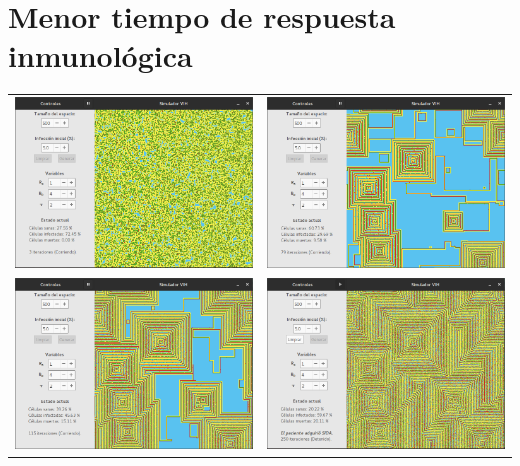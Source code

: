 \documentclass[12pt,letterpaper,oneside]{report}
\begin{document}
	\section{Menor tiempo de respuesta inmunológica} %
	\label{sec:menor_tiempo_de_respuesta_inmunol_gica}
	\begin{center}
		\begin{tabular}{c c}
		\includegraphics[width=8cm]{img/tiempo/prueba/baja/1.png} & \includegraphics[width=8cm]{img/tiempo/prueba/baja/2.png} \\
		\includegraphics[width=8cm]{img/tiempo/prueba/baja/3.png} & \includegraphics[width=8cm]{img/tiempo/prueba/baja/4.png} \\
		\end{tabular}
	\end{center}
\end{document}
